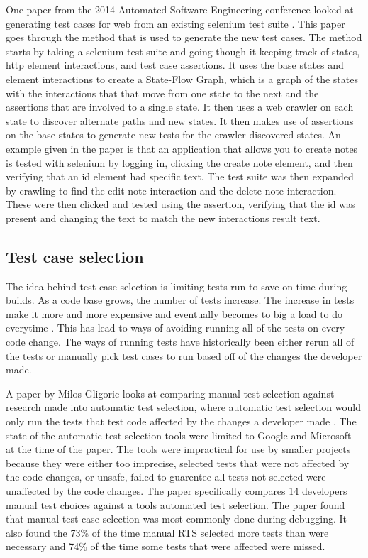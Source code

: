     One paper from the 2014 Automated Software Engineering conference looked at generating test cases for web from an existing selenium test suite \cite{WebTestGeneration}. 
    This paper goes through the method that is used to generate the new test cases. The method starts by taking a selenium test suite and going though it keeping track of states, 
    http element interactions, and test case assertions. It uses the base states and element interactions to create a State-Flow Graph, which is a graph of the states with the interactions 
    that that move from one state to the next and the assertions that are involved to a single state. It then uses a web crawler on each state to discover alternate paths and new states. 
    It then makes use of assertions on the base states to generate new tests for the crawler discovered states. An example given in the paper is that an application that allows you to 
    create notes is tested with selenium by logging in, clicking the create note element, and then verifying that an id element had specific text. The test suite was then expanded by crawling
    to find the edit note interaction and the delete note interaction. These were then clicked and tested using the assertion, verifying that the id was present and changing the text to match the
    new interactions result text.

\subsection{Test case selection}
    The idea behind test case selection is limiting tests run to save on time during builds. As a code base grows, the number of tests increase. The increase in tests make it more and more expensive
    and eventually becomes to big a load to do everytime \cite{googletest, googlescale}. This has lead to ways of avoiding running all of the tests on every code change. The ways of running tests
    have historically been either rerun all of the tests or manually pick test cases to run based off of the changes the developer made.

    A paper by Milos Gligoric looks at comparing manual test selection against research made into automatic test selection, where automatic test selection would only run the tests that test code
    affected by the changes a developer made \cite{TestCaseSelction}. The state of the automatic test selection tools were limited to Google and Microsoft at the time of the paper. The tools were
    impractical for use by smaller projects because they were either too imprecise, selected tests that were not affected by the code changes, or unsafe, failed to guarentee all tests not selected
    were unaffected by the code changes. The paper specifically compares 14 developers manual test choices against a tools automated test selection. The paper found that manual test case selection
    was most commonly done during debugging. It also found the 73\% of the time manual RTS selected more tests than were necessary and 74\% of the time some tests that were affected were missed.

